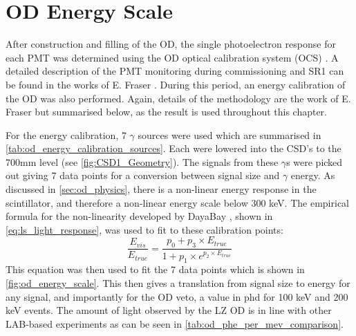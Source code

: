 \section{OD Energy Scale} \label{sec:od_energy_scale}
\par
After construction and filling of the OD, the single photoelectron response for each PMT was determined using the OD optical calibration system (OCS) \cite{lz_ocs_system_ref}.
A detailed description of the PMT monitoring during commissioning and SR1 can be found in the works of E. Fraser \cite{ewanfraser_thesis_ref}. 
During this period, an energy calibration of the OD was also performed.
Again, details of the methodology are the work of E. Fraser \cite{ewanfraser_thesis_ref} but summarised below, as the result is used throughout this chapter.
\par
For the energy calibration, 7 $\gamma$ sources were used which are summarised in \autoref{tab:od_energy_calibration_sources}.
Each were lowered into the CSD's to the 700mm level (see \autoref{fig:CSD1_Geometry}).
The signals from these $\gamma$s were picked out giving 7 data points for a conversion between signal size and $\gamma$ energy.
As discussed in \autoref{sec:od_physics}, there is a non-linear energy response in the scintillator, and therefore a non-linear energy scale below 300 keV.
The empirical formula for the non-linearity developed by DayaBay \cite{dayabay_antineutrino_oscillation_ref, ls_nonlinear_energy_response_ref}, shown in \autoref{eq:ls_light_response}, was used to fit to these calibration points:
\begin{equation}
    \frac{E_{vis}}{E_{true}} = \frac{p_0  + p_3 \times E_{true}}{1 + p_1 \times e^{p_2 \times E_{true}}}
    \label{eq:ls_light_response}
\end{equation}
This equation was then used to fit the 7 data points which is shown in \autoref{fig:od_energy_scale}.
This then gives a translation from signal size to energy for any signal, and importantly for the OD veto, a value in phd for 100 keV and 200 keV events.
The amount of light observed by the LZ OD is in line with other LAB-based experiments as can be seen in \autoref{tab:od_phe_per_mev_comparison}.

